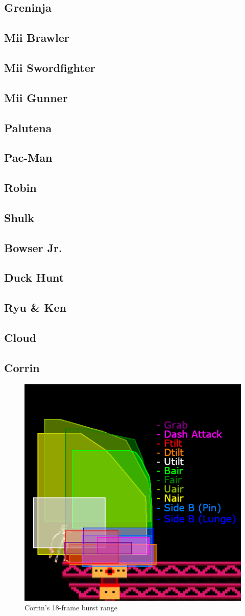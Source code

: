 \begin{multicols}{2}
\subsection{Greninja}
\subsection{Mii Brawler}
\subsection{Mii Swordfighter}
\subsection{Mii Gunner}
\subsection{Palutena}
\subsection{Pac-Man}
\subsection{Robin}
\subsection{Shulk}
\subsection{Bowser Jr.}
\subsection{Duck Hunt}
\subsection{Ryu \& Ken}
\subsection{Cloud}
\subsection{Corrin}
\begin{figure}[H]
    \centering
    \includegraphics[width=.45\textwidth]{images/burst-ranges/corrin}
    \caption{Corrin's 18-frame burst range\cite{ref:burst-range:corrin}}
\end{figure}


\end{multicols}
